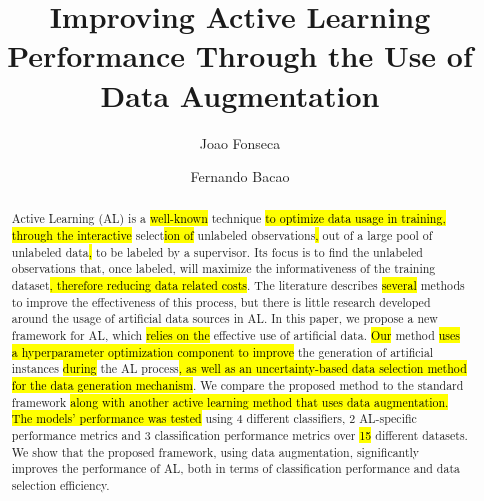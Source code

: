 \documentclass[preprint, 12pt]{elsarticle}
\begin{document}
\begin{frontmatter}

\title{%
    Improving Active Learning Performance Through the Use of Data Augmentation
}

\author[inst1]{Joao Fonseca}
\author[inst1]{Fernando Bacao}


\begin{abstract}

    Active Learning (AL) is a \hl{well-known} technique \hl{to optimize data
    usage in training, through the interactive} select\hl{ion of} unlabeled
    observations\hl{,} out of a large pool of unlabeled data\hl{,} to be
    labeled by a supervisor. Its focus is to find the unlabeled observations
    that, once labeled, will maximize the informativeness of the training
    dataset\hl{, therefore reducing data related costs}.  The literature
    describes \hl{several} methods to improve the effectiveness of this
    process, but there is little research developed around the usage of
    artificial data sources in AL\@. In this paper, we propose a new framework
    for AL, which \hl{relies on the} effective use of artificial data.
    \hl{Our} method \hl{uses a hyperparameter optimization component to
    improve} the generation of artificial instances \hl{during} the AL
    process\hl{, as well as an uncertainty-based data selection method for the
    data generation mechanism}. We compare the proposed method to the standard
    framework \hl{along with another active learning method that uses data
    augmentation. The models' performance was tested} using 4 different
    classifiers, 2 AL-specific performance metrics and 3 classification
    performance metrics over \hl{15} different datasets. We show that the
    proposed framework, using data augmentation, significantly improves the
    performance of AL, both in terms of classification performance and data
    selection efficiency. 

\end{abstract}


\end{frontmatter}
\end{document}
